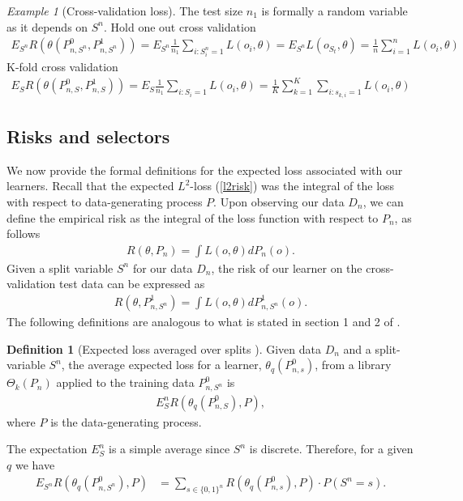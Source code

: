 \documentclass[11pt, a4paper]{article}
\theoremstyle{definition}
\newtheorem{definition}[theorem]{Definition}
\theoremstyle{remark}
\newtheorem{example}{Example}
\newcommand{\q}{q}
\newcommand{\ml}{k}
\newcommand{\btheta}{\theta}
\newcommand{\Sn}{S^n}
\newcommand{\lib}{\Theta}
\begin{document}
\begin{example}[Cross-validation loss]
   The test size $ n_1 $ is formally a random variable as it depends on $ \Sn $.
   Hold one out cross validation
   \begin{align*}
       E_{\Sn} R(\theta(P_{n, \Sn}^{0} , P_{n, \Sn}^{1}))= E_{\Sn} \frac{1}{n_1} \sum_{i : \Sn_i = 1} L(o_i, \theta) = E_{\Sn} L(o_{S_t}, \theta) = \frac{1}{n} \sum_{i = 1}^{n} L(o_i, \theta) 
   \end{align*}
  K-fold cross validation 
  \begin{align*}
      E_S R(\theta(P_{n, S}^{0} , P_{n, S}^{1}))= E_S \frac{1}{n_1} \sum_{i : S_i = 1} L(o_i, \theta) =  \frac{1}{K} \sum_{k = 1}^{K} \sum_{i:s_{k,i} = 1} L(o_i, \theta) 
  \end{align*}
  
\end{example}

\subsection{Risks and selectors}
We now provide the formal definitions for the expected loss associated with our learners. Recall that the expected $L^2$-loss (\ref{l2risk}) was the integral of the loss with respect to data-generating process $P$. Upon observing our data $D_n$, we can define the empirical risk as the integral of the loss function with respect to $P_n$, as follows
\begin{align*}
    R(\theta , P_n) = \int L(o, \btheta) d P_{n}(o).
\end{align*}
Given a split variable $\Sn$ for our data $D_n$, the risk of our learner on the cross-validation test data can be expressed as
 \begin{align*}
     R(\theta, P_{n, \Sn}^{1}) =  \int L(o, \btheta) d P_{n,\Sn}^{1}(o).
 \end{align*}
 The following definitions are analogous to what is stated in section 1 and 2 of  \parencite{laan03}.
 \begin{definition}[Expected loss averaged over splits \parencite{vaart06}]
     Given data $D_n$ and a split-variable $\Sn$, the average expected loss for a learner, $\theta_q(P_{n,s}^0)$, from a library $\lib_{\ml}(P_n)$ applied to the training data $P_{n,\Sn}^0$ is
    \begin{align*}
        E_\Sn R( \btheta_\q(P_{n,S}^{0}), P),
    \end{align*}
    where $ P $ is the data-generating process.
\end{definition}
The expectation $ E_\Sn $ is a simple average since $ \Sn $ is discrete. Therefore, for a given $ \q $ we have 
\begin{align*}
    E_{\Sn} R( \btheta_\q(P_{n,\Sn}^{0}), P) &= \sum_{s \in \{0,1\}^{n}} R(\theta_{q}(P_{n, s}^{0}), P) \cdot P(\Sn = s). 
\end{align*}
\end{document}
